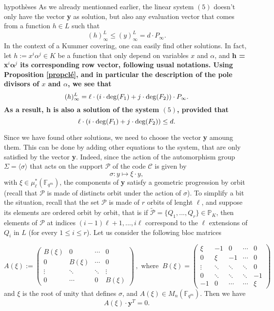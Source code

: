 \documentclass[10pt]{article}
\newcommand{\s}{\vspace{0.3cm}}
\newcommand{\cd}{\cdot}
\newcommand{\PP}{\mathbb{P}}
\newcommand{\fqm}{\mathbb{F}_{q^m}}
\newcommand{\PR}{\mathcal{P}}
\begin{document}
\s
hypothèses
As we already mentionned earlier, the linear system $(5)$ doesn't only have the vector \textbf{y} as solution, but also any evaluation vector that comes from a function $h \in L$ such that 
\[(h)^L_{\infty} \leq (y)^L_{\infty} = d \cd P_{\infty}.\]
In the context of a Kummer covering, one can easily find other solutions. In fact, let $h := x^i\alpha^j \in K$ be a function that only depend on variables $x$ and $\alpha$, and \bf{h} \rm = \textbf{x}$^i\boldsymbol{\alpha}^j$ \rm its corresponding row vector, following usual notations. Using Proposition \ref{propclé}, and in particular the description of the pole divisors of $x$ and $\alpha$, we see that 
\[ (h)^L_{\infty} = \ell \cd \left(i \cd \deg(F_1)+j \cd \deg(F_{\rm 2})\right) \cd P_{\infty}.\]
As a result, \bf{h} \rm is also a solution of the system $(5)$, provided that
\[\ell \cd \left(i \cd \deg(F_1)+j \cd \deg(F_{\rm 2})\right) \leq d.\]


\s

Since we have found other solutions, we need to choose the vector \textbf{y} amoung them. This can be done by adding other equations to the system, that are only satisfied by the vector \textbf{y}. Indeed, since the action of the automorphism group $\Sigma = \langle\sigma\rangle$ that acts on the support $\PR$ of the code $\mathcal{C}$ is given by 
\[\sigma : y \longmapsto \xi \cd y,\]
with $\xi \in \mu^*_{\ell}(\fqm)$, the components of \textbf{y} satisfy a geometric progression by orbit (recall that $\PR$ is made of distincts orbit under the action of $\sigma$). To simplify a bit the situation, recall that the set $\PR$ is made of $r$ orbits of lenght $\ell$, and suppose its elements are ordered orbit by orbit, that is if $\tilde{\PR} = \{Q_1,...,Q_r\} \in \PP_K$, then elements of $\PR$ at indices $(i-1)\ell+1,...,i\ell$ correspond to the $\ell$ extensions of $Q_{i}$ in $L$ (for every $1\leq i \leq r$). Let us consider the following bloc matrices

\begin{equation*} 
A(\xi) := 
\begin{pmatrix}
B(\xi) & 0 & \cdots & 0 \\
0 & B(\xi) & \cdots & 0 \\
\vdots & \ddots & \ddots & \vdots \\
0 & \cdots & 0 & B(\xi)
\end{pmatrix} \ , \textrm{ where }\ 
B(\xi) = 
\begin{pmatrix}
\xi & -1 & 0 & \cdots & 0 \\
0 & \xi & -1 & \cdots & 0 \\
\vdots & \ddots & \ddots & \ddots & 0 \\
0 & \ddots & \ddots & \ddots & -1 \\
-1 & 0 & \cdots & \cdots & \xi
\end{pmatrix}
\end{equation*}
and $\xi$ is the root of unity that defines $\sigma$, and $A(\xi) \in M_{n}(\fqm)$. Then we have
\begin{equation*}
A(\xi) \cd \textbf{y}^T
= 0.
\end{equation*}
\end{document}

